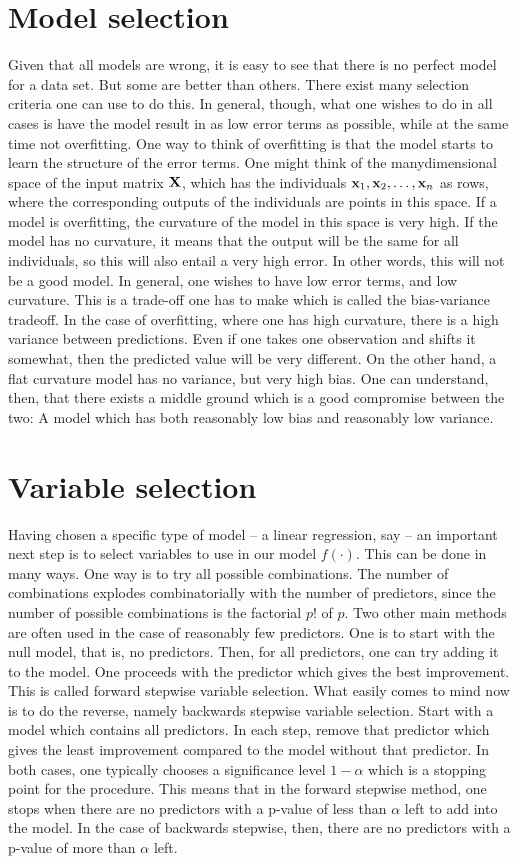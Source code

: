 \section{Model selection}
Given that all models are wrong, it is easy to see that there is no perfect model for a data set. But some are better than others. There exist many selection criteria one can use to do this. In general, though, what one wishes to do in all cases is have the model result in as low error terms as possible, while at the same time not overfitting. One way to think of overfitting is that the model starts to learn the structure of the error terms. One might think of the manydimensional space of the input matrix $\mathbf{X}$, which has the individuals $\mathbf{x}_{1},\mathbf{x}_{2},\ldots,\mathbf{x}_{n}$ as rows, where the corresponding outputs of the individuals are points in this space. If a model is overfitting, the curvature of the model in this space is very high. If the model has no curvature, it means that the output will be the same for all individuals, so this will also entail a very high error. In other words, this will not be a good model. In general, one wishes to have low error terms, and low curvature. This is a trade-off one has to make which is called the bias-variance tradeoff. In the case of overfitting, where one has high curvature, there is a high variance between predictions. Even if one takes one observation and shifts it somewhat, then the predicted value will be very different. On the other hand, a flat curvature model has no variance, but very high bias. One can understand, then, that there exists a middle ground which is a good compromise between the two: A model which has both reasonably low bias and reasonably low variance.

\section{Variable selection}
Having chosen a specific type of model -- a linear regression, say -- an important next step is to select variables to use in our model $f(\cdot)$. This can be done in many ways. One way is to try all possible combinations. The number of combinations explodes combinatorially with the number of predictors, since the number of possible combinations is the factorial $p!$ of $p$. Two other main methods are often used in the case of reasonably few predictors. One is to start with the null model, that is, no predictors. Then, for all predictors, one can try adding it to the model. One proceeds with the predictor which gives the best improvement. This is called forward stepwise variable selection. What easily comes to mind now is to do the reverse, namely backwards stepwise variable selection. Start with a model which contains all predictors. In each step, remove that predictor which gives the least improvement compared to the model without that predictor. In both cases, one typically chooses a significance level $1-\alpha$ which is a stopping point for the procedure. This means that in the forward stepwise method, one stops when there are no predictors with a p-value of less than $\alpha$ left to add into the model. In the case of backwards stepwise, then, there are no predictors with a p-value of more than $\alpha$ left.

